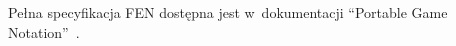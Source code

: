 %
%
%
Pełna specyfikacja FEN dostępna jest w~dokumentacji \enquote{Portable Game Notation}~\cite*{PGNdoc}.

